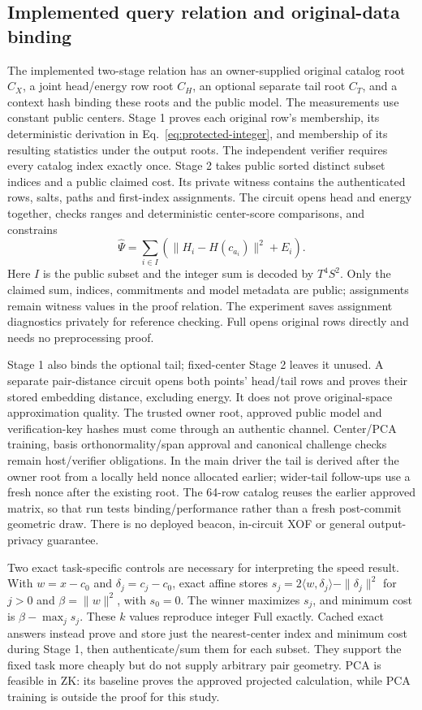 \subsection{Implemented query relation and original-data binding}\label{sec:query-relation}
The implemented two-stage relation has an owner-supplied original catalog root $C_X$, a joint head/energy row root $C_H$, an optional separate tail root $C_T$, and a context hash binding these roots and the public model. The measurements use constant public centers. Stage 1 proves each original row's membership, its deterministic derivation in Eq.~\eqref{eq:protected-integer}, and membership of its resulting statistics under the output roots. The independent verifier requires every catalog index exactly once. Stage 2 takes public sorted distinct subset indices and a public claimed cost. Its private witness contains the authenticated rows, salts, paths and first-index assignments. The circuit opens head and energy together, checks ranges and deterministic center-score comparisons, and constrains
\begin{equation}
\widehat\Psi=\sum_{i\in I}\left(\|H_i-H(c_{a_i})\|^2+E_i\right).
\end{equation}
Here $I$ is the public subset and the integer sum is decoded by $T^4S^2$. Only the claimed sum, indices, commitments and model metadata are public; assignments remain witness values in the proof relation. The experiment saves assignment diagnostics privately for reference checking. Full opens original rows directly and needs no preprocessing proof.

Stage 1 also binds the optional tail; fixed-center Stage 2 leaves it unused. A separate pair-distance circuit opens both points' head/tail rows and proves their stored embedding distance, excluding energy. It does not prove original-space approximation quality. The trusted owner root, approved public model and verification-key hashes must come through an authentic channel. Center/PCA training, basis orthonormality/span approval and canonical challenge checks remain host/verifier obligations. In the main driver the tail is derived after the owner root from a locally held nonce allocated earlier; wider-tail follow-ups use a fresh nonce after the existing root. The 64-row catalog reuses the earlier approved matrix, so that run tests binding/performance rather than a fresh post-commit geometric draw. There is no deployed beacon, in-circuit XOF or general output-privacy guarantee.

Two exact task-specific controls are necessary for interpreting the speed result. With $w=x-c_0$ and $\delta_j=c_j-c_0$, exact affine stores $s_j=2\langle w,\delta_j\rangle-\|\delta_j\|^2$ for $j>0$ and $\beta=\|w\|^2$, with $s_0=0$. The winner maximizes $s_j$, and minimum cost is $\beta-\max_j s_j$. These $k$ values reproduce integer Full exactly. Cached exact answers instead prove and store just the nearest-center index and minimum cost during Stage 1, then authenticate/sum them for each subset. They support the fixed task more cheaply but do not supply arbitrary pair geometry. PCA is feasible in ZK: its baseline proves the approved projected calculation, while PCA training is outside the proof for this study.

